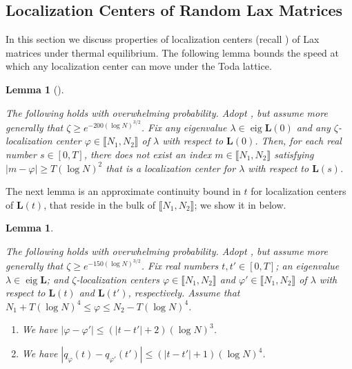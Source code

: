 \documentclass{amsart}
\numberwithin{equation}{section}
\DeclareMathOperator{\eig}{eig}
\newtheorem{lem}[thm]{Lemma}
\theoremstyle{remark}
\theoremstyle{definition}
\begin{document}
	
	
		
		
 	
 	\subsection{Localization Centers of Random Lax Matrices}
 	
 	\label{Center}
	
	In this section we discuss properties of localization centers (recall ) of Lax matrices under thermal equilibrium. The following lemma bounds the speed at which any localization center can move under the Toda lattice.

	\begin{lem}[{\cite[Lemma 5.2]{LC}}]
		
	\label{centert} 
	
	The following holds with overwhelming probability. Adopt , but assume more generally that $\zeta \ge e^{-200(\log N)^{3/2}}$. Fix any eigenvalue $\lambda \in \eig \bm{L}(0)$ and any $\zeta$-localization center $\varphi \in \llbracket N_1, N_2 \rrbracket$ of $\lambda$ with respect to $\bm{L}(0)$. Then, for each real number $s \in [0, T]$, there does not exist an index $m \in \llbracket N_1, N_2 \rrbracket$ satisfying $|m - \varphi| \ge T(\log N)^2$ that is a localization center for $\lambda$ with respect to $\bm{L}(s)$. 
	

	
	\end{lem} 

	The next lemma is an approximate continuity bound in $t$ for localization centers of $\bm{L}(t)$, that reside in the bulk of $\llbracket N_1, N_2 \rrbracket$; we show it in  below.
	
	\begin{lem} 
		
		\label{centerdistance} 
		
		
		The following holds with overwhelming probability. Adopt , but assume more generally that $\zeta \ge e^{-150 (\log N)^{3/2}}$. Fix real numbers $t, t' \in [0, T]$; an eigenvalue $\lambda \in \eig \bm{L}$; and $\zeta$-localization centers $\varphi \in \llbracket N_1, N_2 \rrbracket$ and $\varphi' \in \llbracket N_1, N_2 \rrbracket$ of $\lambda$ with respect to $\bm{L}(t)$ and $\bm{L}(t')$, respectively. Assume that $N_1 + T (\log N)^4 \le \varphi \le N_2 - T (\log N)^4$. 
		
		\begin{enumerate}
			\item We have $|\varphi - \varphi'| \le (|t-t'| + 2) (\log N)^3$. 
			\item We have $|q_{\varphi} (t) - q_{\varphi'} (t')| \le (|t-t'| + 1) (\log N)^4$. 
		\end{enumerate}
		
	\end{lem} 
	
\end{document}

